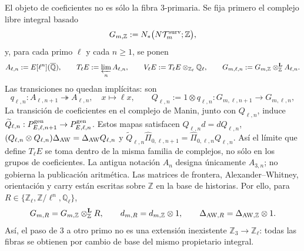 El objeto de coeficientes no es sólo la fibra $3$-primaria. Se fija primero
el complejo libre integral basado
\begin{equation}\label{eq:pdf2-bsd-gmz}
 G_{m,\mathbb Z}:=N_*\bigl(N\mathcal T_m^{\rm surv};\mathbb Z\bigr),
\end{equation}
y, para cada primo $\ell$ y cada $n\geq1$, se ponen
\begin{equation}\label{eq:pdf2-bsd-coeficientes-todos-ell}
 A_{\ell,n}:=E[\ell^n](\overline{\mathbb Q}),\qquad
 T_\ell E:=\varprojlim_nA_{\ell,n},\qquad
 V_\ell E:=T_\ell E\otimes_{\mathbb Z_\ell}\mathbb Q_\ell,
 \qquad
 G_{m,\ell,n}:=G_{m,\mathbb Z}\otimes_{\mathbb Z}^{\mathbf L}A_{\ell,n}.
\end{equation}
Las transiciones no quedan implícitas: son
\begin{equation}\label{eq:pdf2-bsd-transiciones-ell-n}
 q_{\ell,n}:A_{\ell,n+1}\twoheadrightarrow A_{\ell,n},
 \quad x\longmapsto\ell x,
 \qquad
 Q_{\ell,n}:=1\otimes q_{\ell,n}:G_{m,\ell,n+1}\to G_{m,\ell,n},
\end{equation}
La transición de coeficientes en el complejo de Manin, junto con
$Q_{\ell,n}$, induce
$\widetilde Q_{\ell,n}:P_{E,\ell,n+1}^{\rm gen}\to
P_{E,\ell,n}^{\rm gen}$. Estos mapas satisfacen
$Q_{\ell,n}d=dQ_{\ell,n}$,
$(Q_{\ell,n}\otimes Q_{\ell,n})\Delta_{\rm AW}
=\Delta_{\rm AW}Q_{\ell,n}$ y
$\widetilde Q_{\ell,n}\widehat\Pi_{0,\ell,n+1}
=\widehat\Pi_{0,\ell,n}Q_{\ell,n}$. Así el límite que define $T_\ell E$
se toma dentro de la misma familia de complejos, no sólo en los grupos de
coeficientes.
La antigua notación $A_n$ designa únicamente
$A_{3,n}$; no gobierna la publicación aritmética. Las matrices de frontera,
Alexander--Whitney, orientación y carry están escritas sobre $\mathbb Z$ en
la base de historias. Por ello, para
$R\in\{\mathbb Z_\ell,\mathbb Z/\ell^n,\mathbb Q_\ell\}$,
\begin{equation}\label{eq:pdf2-bsd-base-change-integral}
 G_{m,R}=G_{m,\mathbb Z}\otimes_{\mathbb Z}^{\mathbf L}R,
 \qquad
 d_{m,R}=d_{m,\mathbb Z}\otimes1,
 \qquad
 \Delta_{{\rm AW},R}=\Delta_{{\rm AW},\mathbb Z}\otimes1.
\end{equation}
Así, el paso de $3$ a otro primo no es una extensión inexistente
$\mathbb Z_3\to\mathbb Z_\ell$: todas las fibras se obtienen por cambio de
base del mismo propietario integral.

